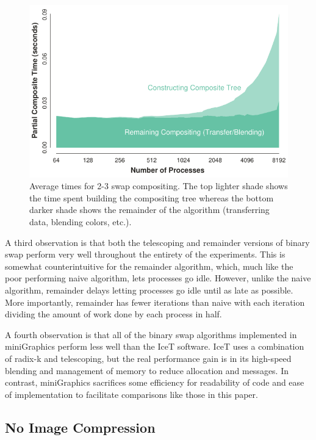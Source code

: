 \documentclass{vgtc}                          %
\newcommand{\textalgorithm}[1]{\textsf{#1}\xspace}
\newcommand{\binaryswap}{\textalgorithm{binary swap}}
\newcommand{\ttswap}{\textalgorithm{2-3 swap}}
\newcommand{\naive}{\textalgorithm{naive}}
\newcommand{\telescoping}{\textalgorithm{telescoping}}
\newcommand{\remainder}{\textalgorithm{remainder}}
\newcommand{\radixk}{\textalgorithm{radix-k}}
\begin{document}
\begin{figure}[htb]
  \centering
  \includegraphics[width=\linewidth]{2-3-swap-overhead}
  \caption{
    Average times for \ttswap compositing.
    The top lighter shade shows the time spent building the compositing tree whereas the bottom darker shade shows the remainder of the algorithm (transferring data, blending colors, etc.).
  }
  \label{fig:23SwapOverhead}
\end{figure}

A third observation is that both the \telescoping and \remainder versions of binary swap perform very well throughout the entirety of the experiments.
This is somewhat counterintuitive for the \remainder algorithm, which, much like the poor performing \naive algorithm, lets processes go idle.
However, unlike the \naive algorithm, \remainder delays letting processes go idle until as late as possible.
More importantly, \remainder has fewer iterations than \naive with each iteration dividing the amount of work done by each process in half.

A fourth observation is that all of the \binaryswap algorithms implemented in miniGraphics perform less well than the IceT software.
IceT uses a combination of \radixk and \telescoping, but the real performance gain is in its high-speed blending and management of memory to reduce allocation and messages.
In contrast, miniGraphics sacrifices some efficiency for readability of code and ease of implementation to facilitate comparisons like those in this paper.

\subsection{No Image Compression}
\label{sec:FullImages}
\end{document}
